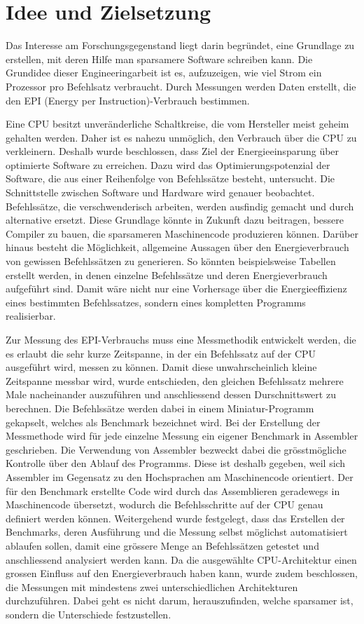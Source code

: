 \chapter{Idee und Zielsetzung}



Das Interesse am Forschungsgegenstand liegt darin begründet, eine Grundlage zu erstellen, mit deren Hilfe man sparsamere Software schreiben kann. Die Grundidee dieser Engineeringarbeit ist es, aufzuzeigen, wie viel Strom ein Prozessor pro Befehlsatz verbraucht. Durch Messungen werden Daten erstellt, die den EPI (Energy per Instruction)-Verbrauch bestimmen.
\par 
Eine CPU besitzt unveränderliche Schaltkreise, die vom Hersteller meist geheim gehalten werden. Daher ist es nahezu unmöglich, den Verbrauch über die CPU zu verkleinern. Deshalb wurde beschlossen, dass Ziel der Energieeinsparung über optimierte Software zu erreichen. Dazu wird das Optimierungspotenzial der Software, die aus einer Reihenfolge von Befehlssätze besteht, untersucht. Die Schnittstelle zwischen Software und Hardware wird genauer beobachtet. Befehlssätze, die verschwenderisch arbeiten, werden ausfindig gemacht und durch alternative ersetzt. Diese Grundlage könnte in Zukunft dazu beitragen, bessere Compiler zu bauen, die sparsameren Maschinencode produzieren können. Darüber hinaus besteht die Möglichkeit, allgemeine Aussagen über den Energieverbrauch von gewissen Befehlssätzen zu generieren. So könnten beispielsweise Tabellen erstellt werden, in denen einzelne Befehlssätze und deren Energieverbrauch aufgeführt sind. Damit wäre nicht nur eine Vorhersage über die Energieeffizienz eines bestimmten Befehlssatzes, sondern eines kompletten Programms realisierbar.  
\par
Zur Messung des EPI-Verbrauchs muss eine Messmethodik entwickelt werden, die es erlaubt die sehr kurze Zeitspanne, in der ein Befehlssatz auf der CPU ausgeführt wird, messen zu können. Damit diese unwahrscheinlich kleine Zeitspanne messbar wird, wurde entschieden, den gleichen Befehlssatz mehrere Male nacheinander auszuführen und anschliessend dessen Durschnittswert zu berechnen. Die Befehlssätze werden dabei in einem Miniatur-Programm gekapselt, welches als Benchmark bezeichnet wird. Bei der Erstellung der Messmethode wird für jede einzelne Messung ein eigener Benchmark in Assembler geschrieben. Die Verwendung von Assembler bezweckt dabei die grösstmögliche Kontrolle über den Ablauf des Programms. Diese ist deshalb gegeben, weil sich Assembler im Gegensatz zu den Hochsprachen am Maschinencode orientiert. Der für den Benchmark erstellte Code wird durch das Assemblieren geradewegs in Maschinencode übersetzt, wodurch die Befehlsschritte auf der CPU genau definiert werden können. Weitergehend wurde festgelegt, dass das Erstellen der Benchmarks, deren Ausführung und die Messung selbst möglichst automatisiert ablaufen sollen, damit eine grössere Menge an Befehlssätzen getestet und anschliessend analysiert werden kann. Da die ausgewählte CPU-Architektur einen grossen Einfluss auf den Energieverbrauch haben kann, wurde zudem beschlossen, die Messungen mit mindestens zwei unterschiedlichen Architekturen durchzuführen. Dabei geht es nicht darum, herauszufinden, welche sparsamer ist, sondern die Unterschiede festzustellen. 

